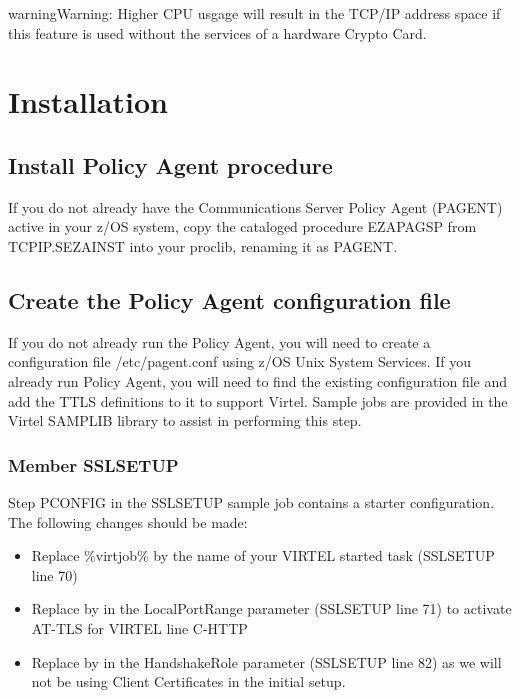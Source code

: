\documentclass[letterpaper,10pt,english]{sphinxmanual}
\begin{document}
\begin{sphinxadmonition}{warning}{Warning:}
Higher CPU usgage will result in the TCP/IP address space if this feature is used without the services of a hardware Crypto Card.
\end{sphinxadmonition}


\section{Installation}
\label{\detokenize{connectivity_guide:installation}}\label{\detokenize{connectivity_guide:index-157}}

\subsection{Install Policy Agent procedure}
\label{\detokenize{connectivity_guide:install-policy-agent-procedure}}
If you do not already have the Communications Server Policy Agent (PAGENT) active in your z/OS system, copy the cataloged procedure EZAPAGSP from TCPIP.SEZAINST into your proclib, renaming it as PAGENT.


\subsection{Create the Policy Agent configuration file}
\label{\detokenize{connectivity_guide:create-the-policy-agent-configuration-file}}
If you do not already run the Policy Agent, you will need to create a configuration file /etc/pagent.conf using z/OS Unix System Services. If you already run Policy Agent, you will need to find the existing configuration file and add the TTLS definitions to it to support Virtel. Sample jobs are provided in the Virtel SAMPLIB library to assist in performing this step.


\subsubsection{Member SSLSETUP}
\label{\detokenize{connectivity_guide:member-sslsetup}}
Step PCONFIG in the SSLSETUP sample job contains a starter configuration. The following changes should be made:
\begin{itemize}
\item {} 
Replace \%virtjob\% by the name of your VIRTEL started task (SSLSETUP line 70)

\item {} 
Replace  by  in the LocalPortRange parameter (SSLSETUP line 71) to activate AT-TLS for VIRTEL line C-HTTP

\item {} 
Replace  by  in the HandshakeRole parameter (SSLSETUP line 82) as we will not be using Client Certificates in the initial setup.

\end{itemize}
\end{document}
